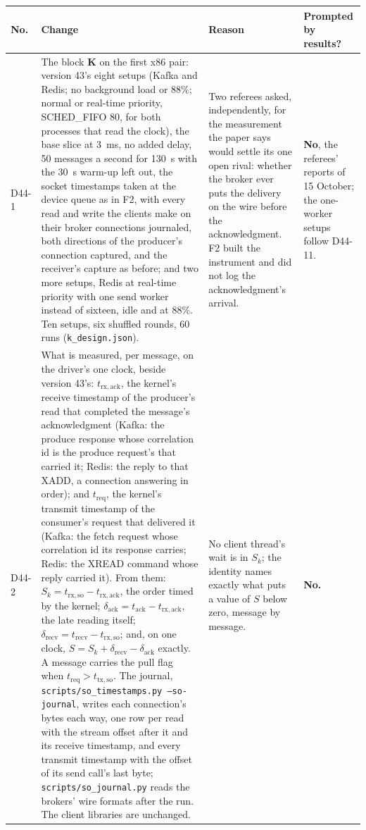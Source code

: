 \documentclass[11pt]{article}
\begin{document}
{\small
\begin{longtable}{@{}p{1.1cm} >{\raggedright\arraybackslash}p{6.1cm} >{\raggedright\arraybackslash}p{6.0cm} >{\raggedright\arraybackslash}p{2.2cm}@{}}
\toprule
\textbf{No.} & \textbf{Change} & \textbf{Reason} & \textbf{Prompted by results?} \\
\midrule
\endhead
D44-1 & The block \textbf{K} on the first x86 pair: version 43's eight setups (Kafka and Redis; no background load or 88\%; normal or real-time priority, SCHED\_FIFO 80, for both processes that read the clock), the base slice at 3~ms, no added delay, 50 messages a second for 130~s with the 30~s warm-up left out, the socket timestamps taken at the device queue as in F2, with every read and write the clients make on their broker connections journaled, both directions of the producer's connection captured, and the receiver's capture as before; and two more setups, Redis at real-time priority with one send worker instead of sixteen, idle and at 88\%. Ten setups, six shuffled rounds, 60 runs (\texttt{k\_design.json}). & Two referees asked, independently, for the measurement the paper says would settle its one open rival: whether the broker ever puts the delivery on the wire before the acknowledgment. F2 built the instrument and did not log the acknowledgment's arrival. & \textbf{No}, the referees' reports of 15 October; the one-worker setups follow D44-11. \\
D44-2 & What is measured, per message, on the driver's one clock, beside version 43's: $t_{\mathrm{rx,ack}}$, the kernel's receive timestamp of the producer's read that completed the message's acknowledgment (Kafka: the produce response whose correlation id is the produce request's that carried it; Redis: the reply to that XADD, a connection answering in order); and $t_{\mathrm{req}}$, the kernel's transmit timestamp of the consumer's request that delivered it (Kafka: the fetch request whose correlation id its response carries; Redis: the XREAD command whose reply carried it). From them: $S_k = t_{\mathrm{rx,so}} - t_{\mathrm{rx,ack}}$, the order timed by the kernel; $\delta_{\mathrm{ack}} = t_{\mathrm{ack}} - t_{\mathrm{rx,ack}}$, the late reading itself; $\delta_{\mathrm{recv}} = t_{\mathrm{recv}} - t_{\mathrm{rx,so}}$; and, on one clock, $S = S_k + \delta_{\mathrm{recv}} - \delta_{\mathrm{ack}}$ exactly. A message carries the pull flag when $t_{\mathrm{req}} > t_{\mathrm{tx,so}}$. The journal, \texttt{scripts/so\_timestamps.py --so-journal}, writes each connection's bytes each way, one row per read with the stream offset after it and its receive timestamp, and every transmit timestamp with the offset of its send call's last byte; \texttt{scripts/so\_journal.py} reads the brokers' wire formats after the run. The client libraries are unchanged. & No client thread's wait is in $S_k$; the identity names exactly what puts a value of $S$ below zero, message by message. & \textbf{No.} \\

\end{longtable}}
\end{document}
